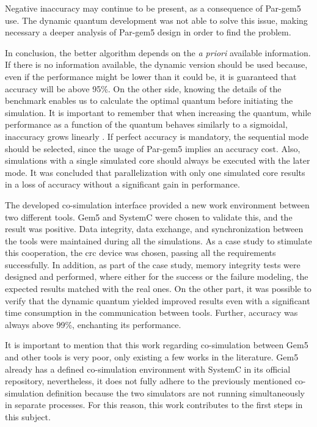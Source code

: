 Negative inaccuracy may continue to be present, as a consequence of Par-gem5 use. The dynamic quantum development was not able to solve this
issue, making necessary a deeper analysis of Par-gem5 design in order to find the problem. 

In conclusion, the better algorithm depends on the \textit{a priori} available information. If there is no information available, the dynamic version should be 
used because, even if the performance might be lower than it could be, it is guaranteed that accuracy will be above 95\%. On the other side,
knowing the details of the benchmark enables us to calculate the optimal quantum before initiating the simulation. It is important to 
remember that when increasing the quantum, while performance as a function of the quantum behaves similarly to a sigmoidal, inaccuracy 
grows linearly \cite*{BeyondQuantumTDSim}. If perfect accuracy is mandatory, the sequential mode should be selected, since the usage of Par-gem5 
implies an accuracy cost. Also, simulations with a single simulated core should always be 
executed with the later mode. It was concluded that parallelization with only one simulated core results in a loss of accuracy 
without a significant gain in performance.

The developed co-simulation interface provided a new work environment between two different tools. Gem5 and SystemC were chosen to validate 
this, and the result was positive. Data integrity, data exchange, and synchronization between the tools were maintained during all the simulations. 
As a case study to stimulate this cooperation, the \gls{crc} device was chosen, 
passing all the requirements successfully. In addition, as part of the case study, 
memory integrity tests were designed and performed, where either for the success or the failure modeling, the expected results matched
with the real ones. On the other part, it was possible to verify that the dynamic quantum yielded improved results even with a significant 
time consumption in the communication between tools. Further, accuracy was always above 99\%, enchanting its performance. 

It is important to mention that this work regarding co-simulation between Gem5 and other tools is very poor, only existing a few works in the 
literature. Gem5 already has a defined co-simulation environment with SystemC in its official repository, nevertheless, it does not 
fully adhere to the previously mentioned co-simulation definition because the two simulators are not running simultaneously in separate processes.
For this reason, this work contributes to the first steps in this subject. 


